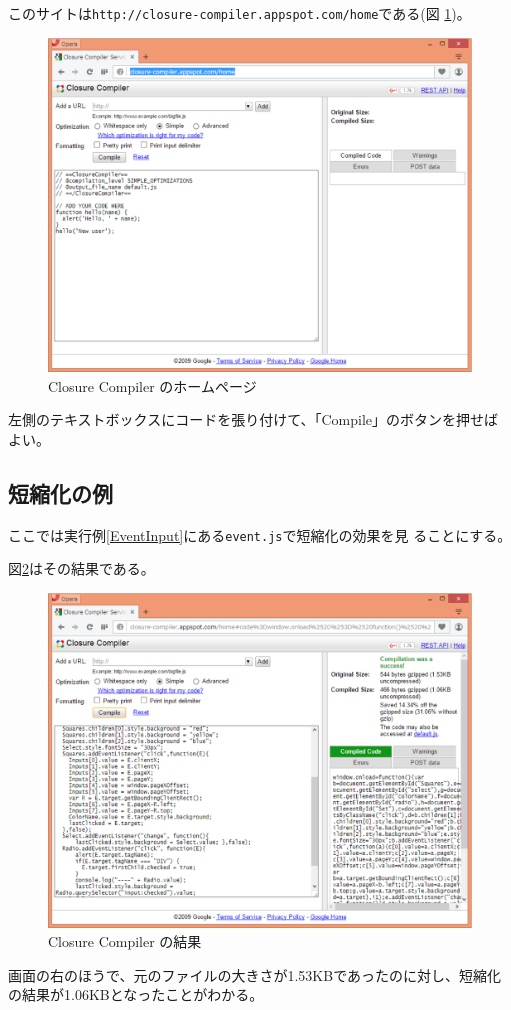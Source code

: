このサイトは\texttt{http://closure-compiler.appspot.com/home}である(図
\ref{closure-compiler})。
 \begin{figure}[ht]
	\begin{center}
	 \includegraphics[width=1\textwidth]{10-01closur-compiler-home.eps}
	\end{center}
 \caption{Closure Compiler のホームページ}\label{closure-compiler}
 \end{figure}
 左側のテキストボックスにコードを張り付けて、「Compile」のボタンを押せば
 よい。
 \newpage
\subsection{短縮化の例}
ここでは実行例\ref{EventInput}にある\texttt{event.js}で短縮化の効果を見
ることにする。

図\ref{closure-compiler-res01}はその結果である。
 \begin{figure}[ht]
	\begin{center}
	 \includegraphics[width=1\textwidth]{10-01closur-compiler-res01.eps}
	\end{center}
 \caption{Closure Compiler の結果}\label{closure-compiler-res01}
 \end{figure}
 画面の右のほうで、元のファイルの大きさが1.53KBであったのに対し、短縮化
 の結果が1.06KBとなったことがわかる。

